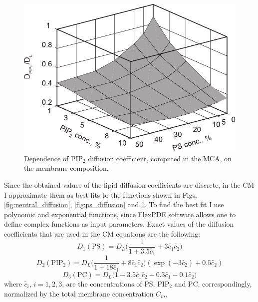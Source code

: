 \begin{figure}[!ht]
\centering
  \includegraphics{../figures/pip_diffusion_no_color.pdf}

\caption[PIP$_2$ diffusion coefficient computed in MCA]{Dependence of PIP$_2$ diffusion coefficient, computed in the MCA, on the membrane composition.}
\label{fig:pip_diffusion}
\end{figure}

Since the obtained values of the lipid diffusion coefficients are discrete, in the CM I approximate them as best fits to the functions shown in Figs. \ref{fig:neutral_diffusion}, \ref{fig:ps_diffusion} and \ref{fig:pip_diffusion}. To find the best fit I use polynomic and exponential functions, since FlexPDE software allows one to define complex functions as input parameters. Exact values of the diffusion coefficients that are used in the CM equations are the following:
\begin{equation}
  D_1 (\text{PS}) = D_L\Big(\frac{1}{1+3.5 \tilde{c_1}} + 3\tilde{c_1}\tilde{c_2}\Big)
\end{equation}
\begin{equation}
  D_2 (\text{PIP}_2) = D_L\Big(\frac{1}{1+18 \tilde{c_1}} + 8\tilde{c_1}\tilde{c_2}\Big)(\exp{(-3\tilde{c_2})}+0.5\tilde{c_2})
\end{equation}
\begin{equation}
  D_3 (\text{PC}) = D_L\Big(1 - 3.5\tilde{c_1}\tilde{c_2} - 0.3\tilde{c_1} - 0.1\tilde{c_2}\Big)
\end{equation}
where $\tilde{c_i}$, $i=1,2,3$, are the concentrations of PS, PIP$_2$ and PC, correspondingly, normalized by the total membrane concentration $C_m$.

